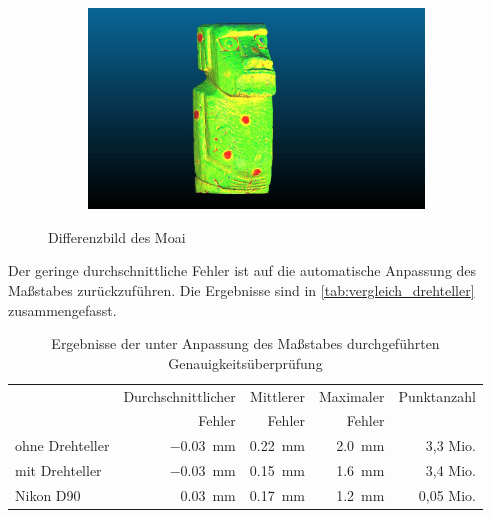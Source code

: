 \documentclass[./00PhotoBox.tex]{subfiles}
\begin{document}
\begin{figure}[htbp]
\begin{subfigure}{0.10\textwidth}
    \end{subfigure}
    \begin{subfigure}{0.85\textwidth}
        \includegraphics[width=0.98\textwidth]{img/7_versuche/moai_fehler_drehteller.jpg}
    \end{subfigure}
    \caption{Differenzbild des Moai}
    \label{img:differenz_moai_drehteller}
\end{figure}

Der geringe durchschnittliche Fehler ist auf die au\-to\-ma\-tische Anpassung des Maßstabes zurückzuführen. Die Ergebnisse sind in \autoref{tab:vergleich_drehteller} zusammengefasst.

\begin{table}[htbp]
    \centering
    \caption{Ergebnisse der unter Anpassung des Maßstabes durchgeführten Genauigkeitsüberprüfung}
    \label{tab:vergleich_drehteller}
    \begin{tabular}{l|r|r|r|r}
        \toprule
                        & Durchschnittlicher       & Mittlerer               & Maximaler              & Punktanzahl \\
                        & Fehler                   & Fehler                  & Fehler                 &             \\
        \midrule
        ohne Drehteller & \SI{-0,03}{\milli\metre} & \SI{0,22}{\milli\metre} & \SI{2,0}{\milli\metre} & 3,3 Mio.    \\
        mit Drehteller  & \SI{-0,03}{\milli\metre} & \SI{0,15}{\milli\metre} & \SI{1,6}{\milli\metre} & 3,4 Mio.    \\
        Nikon D90       & \SI{0,03}{\milli\metre}  & \SI{0,17}{\milli\metre} & \SI{1,2}{\milli\metre} & 0,05 Mio.   \\
        \bottomrule
    \end{tabular}
\end{table}
\end{document}
